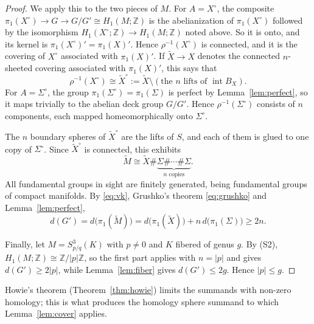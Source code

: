 \documentclass[11pt]{article}
\newcommand{\Z}{\mathbb Z}
\newcommand{\Surg}[2]{S^3_{#1}(#2)}
\newcommand{\Int}{\operatorname{int}}
\newcommand{\rk}{d}
\theoremstyle{definition}
\theoremstyle{remark}
\begin{document}
\begin{proof}
We apply this to the two pieces of \(M\). For \(A=X^\circ\), the composite
\(\pi_1(X^\circ)\to G\to G/G'\cong H_1(M;\Z)\) is the abelianization of
\(\pi_1(X^\circ)\) followed by the isomorphism
\(H_1(X^\circ;\Z)\to H_1(M;\Z)\) noted above.
So it is onto, and its kernel
is \(\pi_1(X^\circ)'=\pi_1(X)'\). Hence \(\rho^{-1}(X^\circ)\) is
connected, and it is the covering of \(X^\circ\) associated with
\(\pi_1(X)'\). If \(\widetilde X\to X\) denotes the connected
\(n\)-sheeted covering associated with \(\pi_1(X)'\), this says that
\[
 \rho^{-1}(X^\circ)\cong\widetilde X^\circ:=\widetilde X\setminus
 (\text{the \(n\) lifts of }\Int B_X).
\]
For \(A=\Sigma^\circ\), the group \(\pi_1(\Sigma^\circ)=\pi_1(\Sigma)\) is
perfect by Lemma~\ref{lem:perfect},
so it maps trivially to the abelian
deck group \(G/G'\). Hence \(\rho^{-1}(\Sigma^\circ)\) consists of \(n\)
components, each mapped homeomorphically onto \(\Sigma^\circ\).

The \(n\) boundary spheres of \(\widetilde X^\circ\) are the lifts of
\(S\), and each of them is glued to one copy of \(\Sigma^\circ\). Since
\(\widetilde X^\circ\) is connected, this exhibits
\begin{equation}\label{eq:cover-sum}
 \widetilde M\cong
 \widetilde X\#\underbrace{\Sigma\#\cdots\#\Sigma}_{n\text{ copies}}.
\end{equation}
All fundamental groups in sight are finitely generated, being
fundamental groups of compact manifolds. By \eqref{eq:vk}, Grushko's
theorem \eqref{eq:grushko} and Lemma~\ref{lem:perfect},
\[
 \rk(G')=\rk\bigl(\pi_1(\widetilde M)\bigr)
 =\rk\bigl(\pi_1(\widetilde X)\bigr)+n\,\rk\bigl(\pi_1(\Sigma)\bigr)
 \geq 2n.
\]

Finally, let \(M=\Surg{p/q}{K}\) with \(p\neq0\) and \(K\) fibered of
genus \(g\). By (S2), \(H_1(M;\Z)\cong\Z/|p|\Z\), so the first part applies
with \(n=|p|\) and gives \(\rk(G')\geq2|p|\), while
Lemma~\ref{lem:fiber} gives \(\rk(G')\leq2g\). Hence \(|p|\leq g\).
\end{proof}

Howie's theorem (Theorem~\ref{thm:howie}) limits the summands with
non-zero homology; this is what produces the homology sphere summand to
which Lemma~\ref{lem:cover} applies.
\end{document}
